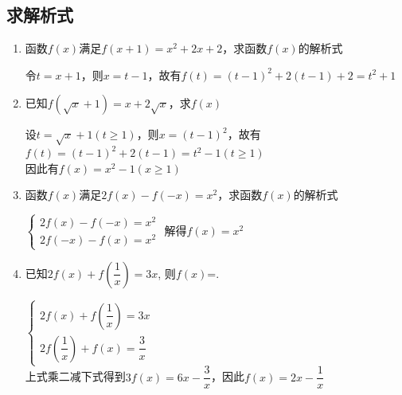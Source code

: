 \subsection*{求解析式}
\begin{enumerate}
    \item 函数$f(x)$满足$f(x+1) = x^2+2x+2$，求函数$f(x)$的解析式
    \begin{jieda}
        令$t = x+1$，则$x = t-1$，故有$f(t) = (t-1)^2+2(t-1)+2=t^2+1$
    \end{jieda}
    \item 已知$f(\sqrt{x} + 1) = x + 2\sqrt{x}$，求$f(x)$
    \begin{jieda}
        设$t = \sqrt{x}+1 (t \geq 1)$，则$x = (t-1)^2$，故有$f(t) = (t-1)^2 + 2(t-1) = t^2 - 1 (t \geq 1)$ \\
        因此有$f(x) = x^2 - 1 (x \geq 1)$
    \end{jieda} 
    \item 函数$f(x)$满足$2f(x) - f(-x) = x^2$，求函数$f(x)$的解析式
    \begin{jieda}
        $\left \{ \begin{array}{l}
            2f(x) - f(-x) = x^2 \\
            2f(-x) - f(x) = x^2
        \end{array}
        \right.$
        解得$f(x) = x^2$
    \end{jieda}
    \item 已知$2f(x)+f\left(\dfrac{1}{x}\right)=3x$, 则$f(x)$=.
    \begin{jieda}
        $\left \{ \begin{array}{l}
            2f(x)+f\left(\dfrac{1}{x}\right)=3x \\
            2f\left(\dfrac{1}{x}\right)+f(x)=\dfrac{3}{x}
        \end{array}
        \right.$ \\
        上式乘二减下式得到$3f(x) = 6x - \dfrac{3}{x}$，因此$f(x) = 2x - \dfrac{1}{x}$
    \end{jieda}
\end{enumerate}
